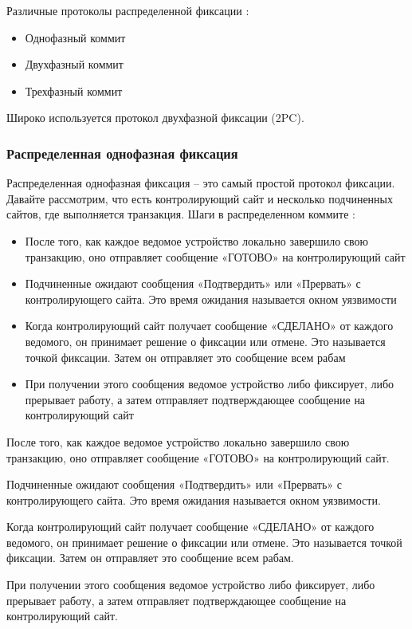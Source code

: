 Различные протоколы распределенной фиксации \autocite{FixProtocols}:
\begin{itemize}
    \item Однофазный коммит
    \item Двухфазный коммит
    \item Трехфазный коммит
\end{itemize}
Широко используется протокол двухфазной фиксации (2PC).
\bigbreak

\subsubsection{Распределенная однофазная фиксация}

Распределенная однофазная фиксация – это самый простой протокол фиксации. Давайте рассмотрим, что есть
контролирующий сайт и несколько подчиненных сайтов, где выполняется транзакция. Шаги в распределенном коммите \autocite{FixProtocols}:
\begin{itemize}
    \item После того, как каждое ведомое устройство локально завершило свою транзакцию, оно
    отправляет сообщение «ГОТОВО» на контролирующий сайт
    \item Подчиненные ожидают сообщения «Подтвердить» или «Прервать» с контролирующего сайта.
    Это время ожидания называется окном уязвимости
    \item Когда контролирующий сайт получает сообщение «СДЕЛАНО» от каждого ведомого, он принимает решение
    о фиксации или отмене. Это называется точкой фиксации. Затем он отправляет это сообщение всем рабам
    \item При получении этого сообщения ведомое устройство либо фиксирует, либо прерывает работу,
    а затем отправляет подтверждающее сообщение на контролирующий сайт
\end{itemize}

После того, как каждое ведомое устройство локально завершило свою транзакцию, оно отправляет сообщение
«ГОТОВО» на контролирующий сайт.

Подчиненные ожидают сообщения «Подтвердить» или «Прервать» с контролирующего сайта. Это время ожидания
называется окном уязвимости.

Когда контролирующий сайт получает сообщение «СДЕЛАНО» от каждого ведомого, он принимает решение о
фиксации или отмене. Это называется точкой фиксации. Затем он отправляет это сообщение всем рабам.

При получении этого сообщения ведомое устройство либо фиксирует, либо прерывает работу,
а затем отправляет подтверждающее сообщение на контролирующий сайт.

